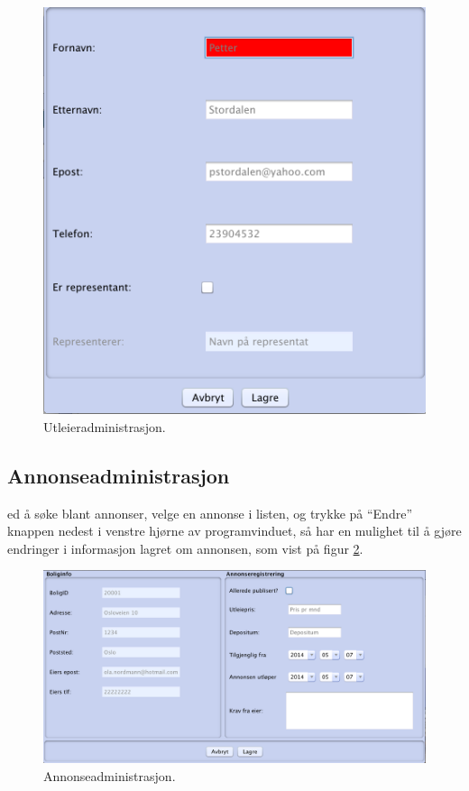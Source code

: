 \begin{figure}[h!]
\center
 \includegraphics[scale=0.5]{./img/brukerveiledning/11.png}
 \caption{Utleieradministrasjon.}
 \label{fig:bv:11}
\end{figure}




\newpage
\subsection{Annonseadministrasjon}
ed å søke blant annonser, velge en annonse i listen, og trykke på “Endre” knappen nedest i venstre hjørne av programvinduet, så har en mulighet til å gjøre endringer i informasjon lagret om annonsen, som vist på figur \ref{fig:bv:12}.

\begin{figure}[h!]
 \includegraphics[width=\textwidth,height=\textheight,keepaspectratio]{./img/brukerveiledning/12.png}
 \caption{Annonseadministrasjon.}
 \label{fig:bv:12}
\end{figure}



